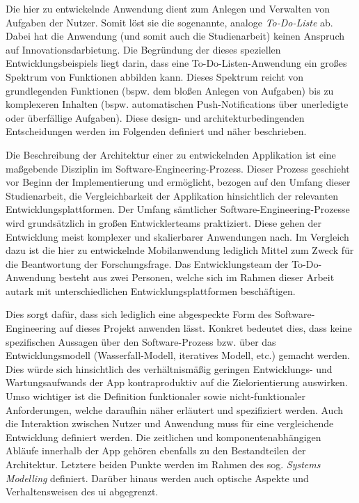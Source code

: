 Die hier zu entwickelnde Anwendung dient zum Anlegen und Verwalten von Aufgaben der Nutzer. Somit löst sie die sogenannte, analoge \textit{To-Do-Liste} ab. Dabei hat die Anwendung (und somit auch die Studienarbeit) keinen Anspruch auf Innovationsdarbietung. Die Begründung der dieses speziellen Entwicklungsbeispiels liegt darin, dass eine To-Do-Listen-Anwendung ein großes Spektrum von Funktionen abbilden kann. Dieses Spektrum reicht von grundlegenden Funktionen (bspw. dem bloßen Anlegen von Aufgaben) bis zu komplexeren Inhalten (bspw. automatischen Push-Notifications über unerledigte oder überfällige Aufgaben). Diese design- und architekturbedingenden Entscheidungen werden im Folgenden definiert und näher beschrieben.

Die Beschreibung der Architektur einer zu entwickelnden Applikation ist eine maßgebende Disziplin im Software-Engineering-Prozess. Dieser Prozess geschieht vor Beginn der Implementierung und ermöglicht, bezogen auf den Umfang dieser Studienarbeit, die Vergleichbarkeit der Applikation hinsichtlich der relevanten Entwicklungsplattformen. Der Umfang sämtlicher Software-Engineering-Prozesse wird grundsätzlich in großen Entwicklerteams praktiziert. Diese gehen der Entwicklung meist komplexer und skalierbarer Anwendungen nach. Im Vergleich dazu ist die hier zu entwickelnde Mobilanwendung lediglich Mittel zum Zweck für die Beantwortung der Forschungsfrage. Das Entwicklungsteam der To-Do-Anwendung besteht aus zwei Personen, welche sich im Rahmen dieser Arbeit autark mit unterschiedlichen Entwicklungsplattformen beschäftigen.

Dies sorgt dafür, dass sich lediglich eine abgespeckte Form des Software-Engineering auf dieses Projekt anwenden lässt. Konkret bedeutet dies, dass keine spezifischen Aussagen über den Software-Prozess bzw. über das Entwicklungsmodell (Wasserfall-Modell, iteratives Modell, etc.) gemacht werden. Dies würde sich hinsichtlich des verhältnismäßig geringen Entwicklungs- und Wartungsaufwands der App kontraproduktiv auf die Zielorientierung auswirken. Umso wichtiger ist die Definition funktionaler sowie nicht-funktionaler Anforderungen, welche daraufhin näher erläutert und spezifiziert werden. Auch die Interaktion zwischen Nutzer und Anwendung muss für eine vergleichende Entwicklung definiert werden. Die zeitlichen und komponentenabhängigen Abläufe innerhalb der App gehören ebenfalls zu den Bestandteilen der Architektur. Letztere beiden Punkte werden im Rahmen des sog. \textit{Systems Modelling} definiert. Darüber hinaus werden auch optische Aspekte und Verhaltensweisen des \ac{ui} abgegrenzt.

